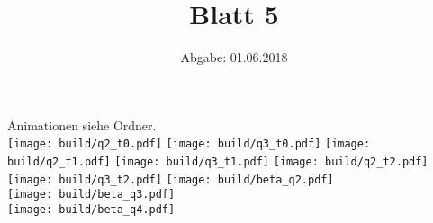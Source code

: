 

\title{Blatt 5}
\date{
  Abgabe: 01.06.2018
}



\parindent0mm
Animationen siehe Ordner.\\
\texttt{[image: build/q2\_t0.pdf]}
\texttt{[image: build/q3\_t0.pdf]}
\texttt{[image: build/q2\_t1.pdf]}
\texttt{[image: build/q3\_t1.pdf]}
\texttt{[image: build/q2\_t2.pdf]}
\texttt{[image: build/q3\_t2.pdf]}
\texttt{[image: build/beta\_q2.pdf]} \\
\texttt{[image: build/beta\_q3.pdf]} \\
\texttt{[image: build/beta\_q4.pdf]}



